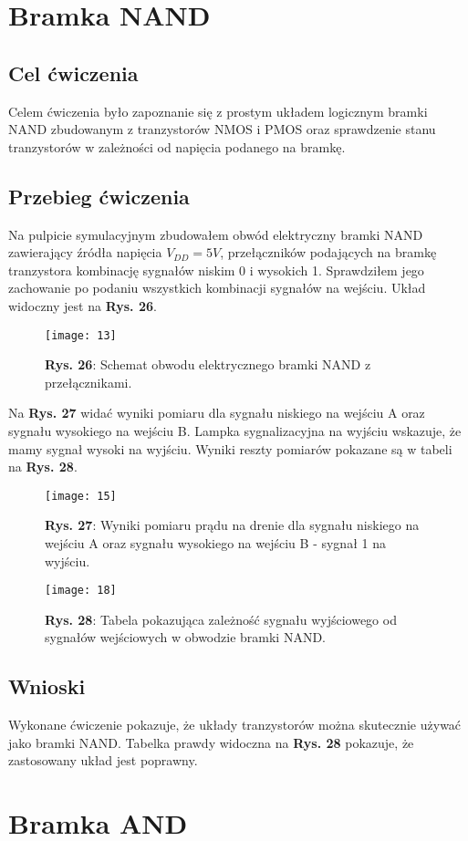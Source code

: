 \documentclass[11pt]{article}
\begin{document}
\section{Bramka NAND}
\subsection{Cel ćwiczenia}
Celem ćwiczenia było zapoznanie się z prostym układem logicznym bramki NAND zbudowanym z tranzystorów NMOS i PMOS oraz sprawdzenie stanu tranzystorów w zależności od napięcia podanego na bramkę.
\subsection{Przebieg ćwiczenia}
Na pulpicie symulacyjnym zbudowałem obwód elektryczny bramki NAND zawierający źródła napięcia $V_{DD}=5V$, przełączników podających na bramkę tranzystora kombinację sygnałów niskim 0 i wysokich 1. Sprawdziłem jego zachowanie
po podaniu wszystkich kombinacji sygnałów na wejściu. Układ widoczny jest na \textbf{Rys. 26}.
\begin{figure}[H]
\centering
\texttt{[image: 13]}
\caption*{\textbf{Rys. 26}: Schemat obwodu elektrycznego bramki NAND z przełącznikami. }
\end{figure}
\noindent Na \textbf{Rys. 27} widać wyniki pomiaru dla sygnału niskiego na wejściu A oraz sygnału wysokiego na wejściu B. Lampka sygnalizacyjna na wyjściu wskazuje, że mamy sygnał wysoki na wyjściu. Wyniki reszty pomiarów pokazane są w tabeli na \textbf{Rys. 28}.
\begin{figure}[H]
\centering
\texttt{[image: 15]}
\caption*{\textbf{Rys. 27}: Wyniki pomiaru prądu na drenie dla sygnału niskiego na wejściu A oraz sygnału wysokiego na wejściu B - sygnał 1 na wyjściu. }
\end{figure}
\begin{figure}[H]
\centering
\texttt{[image: 18]}
\caption*{\textbf{Rys. 28}: Tabela pokazująca zależność sygnału wyjściowego od sygnałów wejściowych w obwodzie bramki NAND.}
\end{figure}
\subsection{Wnioski}
Wykonane ćwiczenie pokazuje, że układy tranzystorów można skutecznie używać jako bramki NAND. Tabelka prawdy widoczna na \textbf{Rys. 28} pokazuje, że zastosowany układ jest poprawny.
\section{Bramka AND}
\end{document}
